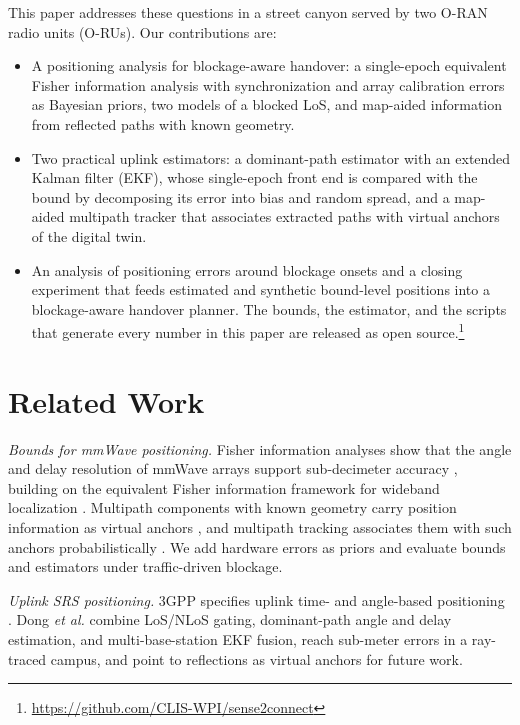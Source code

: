 \documentclass[conference]{IEEEtran}
\begin{document}
This paper addresses these questions in a street canyon served by two
O-RAN radio units (O-RUs). Our contributions are:
\begin{itemize}
\item A positioning analysis for blockage-aware handover: a
single-epoch equivalent Fisher information analysis with
synchronization and array calibration errors as Bayesian priors, two
models of a blocked LoS, and map-aided information from reflected paths
with known geometry.
\item Two practical uplink estimators: a dominant-path estimator with an
extended Kalman filter (EKF), whose single-epoch front end is compared
with the bound by decomposing its error into bias and random spread, and
a map-aided multipath tracker that associates extracted paths with
virtual anchors of the digital twin.
\item An analysis of positioning errors around blockage onsets and a
closing experiment that feeds estimated and synthetic bound-level
positions into a blockage-aware handover planner. The bounds, the
estimator, and the scripts that generate every number in this paper are
released as open source.\footnote{\url{https://github.com/CLIS-WPI/sense2connect}}
\end{itemize}

\section{Related Work}
\textit{Bounds for mmWave positioning.} Fisher information analyses
show that the angle and delay resolution of mmWave arrays support
sub-decimeter accuracy \cite{shahmansoori2018position,abushaban2018bounds},
building on the equivalent Fisher information framework for wideband
localization \cite{shen2010fundamental}. Multipath components with known
geometry carry position information as virtual anchors
\cite{leitinger2015evaluation,witrisal2016high}, and multipath tracking
associates them with such anchors probabilistically
\cite{meyer2018message}. We add hardware errors as priors and evaluate
bounds and estimators under traffic-driven blockage.

\textit{Uplink SRS positioning.} 3GPP specifies uplink time- and
angle-based positioning \cite{3gpp38855}. Dong \emph{et al.}
\cite{dong2026deployable} combine LoS/NLoS gating, dominant-path angle
and delay estimation, and multi-base-station EKF fusion, reach sub-meter
errors in a ray-traced campus, and point to reflections as virtual
anchors for future work.
\end{document}
